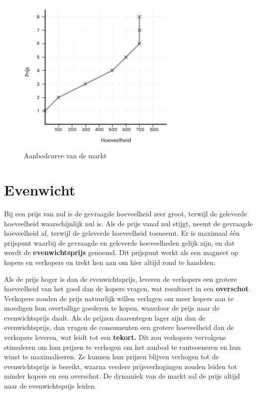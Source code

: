 \begin{figure}[H]
\centering
    \includegraphics[width=0.7\textwidth]{figures/fig25-1.png}
    \caption[Aanbodcurve van de markt]{Aanbodcurve van de markt}
    \label{fig25}
\end{figure}


\hypertarget{evenwicht}{%
\section{Evenwicht}\label{evenwicht}}

Bij een prijs van nul is de gevraagde hoeveelheid zeer groot, terwijl de geleverde hoeveelheid waarschijnlijk nul is. Als de prijs vanaf nul stijgt, neemt de gevraagde hoeveelheid af, terwijl de geleverde hoeveelheid toeneemt. Er is maximaal één prijspunt waarbij de gevraagde en geleverde hoeveelheden gelijk zijn, en dat wordt de \textbf{evenwichtsprijs} genoemd. Dit prijspunt werkt als een magneet op kopers en verkopers en trekt hen aan om hier altijd rond te handelen.

Als de prijs hoger is dan de evenwichtsprijs, leveren de verkopers een grotere hoeveelheid van het goed dan de kopers vragen, wat resulteert in een \textbf{overschot}. Verkopers zouden de prijs natuurlijk willen verlagen om meer kopers aan te moedigen hun overtollige goederen te kopen, waardoor de prijs naar de evenwichtsprijs daalt. Als de prijzen daarentegen lager zijn dan de evenwichtsprijs, dan vragen de consumenten een grotere hoeveelheid dan de verkopers leveren, wat leidt tot een \textbf{tekort.} Dit zou verkopers vervolgens stimuleren om hun prijzen te verhogen om het aanbod te rantsoeneren en hun winst te maximaliseren. Ze kunnen hun prijzen blijven verhogen tot de evenwichtsprijs is bereikt, waarna verdere prijsverhogingen zouden leiden tot minder kopers en een overschot. De dynamiek van de markt zal de prijs altijd naar de evenwichtsprijs leiden.

